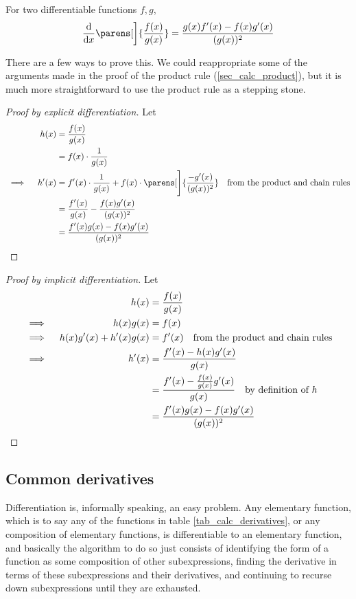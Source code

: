 \begin{theorem}
 For two differentiable functions \(f, g\),
 \begin{equation*}
  \dv{x}\parens[\bigg]{\frac{f(x)}{g(x)}} = \frac{g(x)f'(x) - f(x)g'(x)}{(g(x))^2}
 \end{equation*}
\end{theorem}
There are a few ways to prove this. We could reappropriate some of the arguments
made in the proof of the product rule (\ref{sec_calc_product}), but it is much
more straightforward to use the product rule as a stepping stone.
\begin{proof}[Proof by explicit differentiation]
 Let
 \begin{alignat*}{2}
  && h(x) &= \frac{f(x)}{g(x)} \\
  &&      &= f(x) \cdot \frac 1{g(x)} \\
  &\implies{}& h'(x)
          &= f'(x) \cdot \frac 1{g(x)}
              + f(x) \cdot \parens[\Bigg]{\frac{-g'(x)}{(g(x))^2}}
              \quad \text{from the product and chain rules} \\
  &&      &= \frac{f'(x)}{g(x)} - \frac{f(x)g'(x)}{(g(x))^2} \\
  &&      &= \frac{f'(x)g(x) - f(x)g'(x)}{(g(x))^2} \qedhere
 \end{alignat*}
\end{proof}
\begin{proof}[Proof by implicit differentiation]
 Let
 \begin{alignat*}{2}
  && h(x) &= \frac{f(x)}{g(x)} \\
  &\implies{}& h(x)g(x) &= f(x) \\
  &\implies{}& h(x)g'(x) + h'(x)g(x)
          &= f'(x) \quad \text{from the product and chain rules} \\
  &\implies{}& h'(x)
          &= \frac{f'(x) - h(x)g'(x)}{g(x)} \\
  &&      &= \frac{f'(x) - \frac{f(x)}{g(x)}g'(x)}{g(x)}
              \quad \text{by definition of \(h\)} \\
  &&      &= \frac{f'(x)g(x) - f(x)g'(x)}{(g(x))^2} \qedhere
 \end{alignat*}
\end{proof}

\subsection{Common derivatives} \label{calc_common}

Differentiation is, informally speaking, an easy problem. Any elementary
function, which is to say any of the functions in table
\ref{tab_calc_derivatives}, or any composition of elementary functions, is
differentiable to an elementary function, and basically the algorithm to do
so just consists of identifying the form of a function as some composition
of other subexpressions, finding the derivative in terms of these
subexpressions and their derivatives, and continuing to recurse down
subexpressions until they are exhausted.

